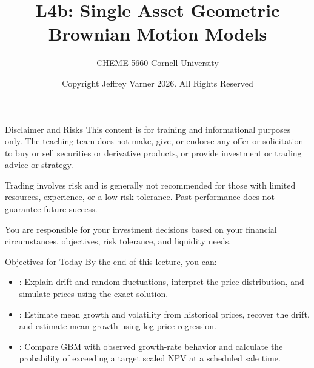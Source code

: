 \documentclass[aspectratio=169,11pt]{beamer}
\title{\texorpdfstring{{\vnheavy L4b}}{L4b}: Single Asset Geometric Brownian Motion Models}
\subtitle{CHEME 5660 Cornell University}
\author{Copyright Jeffrey Varner 2026. All Rights Reserved}
\begin{document}
\vntitlepage

\begin{frame}{Disclaimer and Risks}
  \vspace{0.6em}
  \textbf{} This content is for training and informational
  purposes only. The teaching team does not make, give, or endorse any offer or
  solicitation to buy or sell securities or derivative products, or provide
  investment or trading advice or strategy.

  \vspace{1.1em}
  \textbf{} Trading involves risk and is generally not recommended for
  those with limited resources, experience, or a low risk tolerance. Past
  performance does not guarantee future success.

  \vspace{1.1em}
  \textbf{} You are responsible for your investment decisions
  based on your financial circumstances, objectives, risk tolerance, and
  liquidity needs.
\end{frame}

\begin{frame}{Objectives for Today}
  By the end of this lecture, you can:

  \vspace{0.8em}
  \begin{itemize}\setlength{\itemsep}{0.55em}
    \item {}: Explain drift and random
      fluctuations, interpret the price distribution, and simulate prices
      using the exact solution.
    \item {}: Estimate mean growth
      and volatility from historical prices, recover the drift, and estimate
      mean growth using log-price regression.
    \item {}: Compare GBM
      with observed growth-rate behavior and calculate the probability of
      exceeding a target scaled NPV at a scheduled sale time.
  \end{itemize}
\end{frame}
\end{document}
